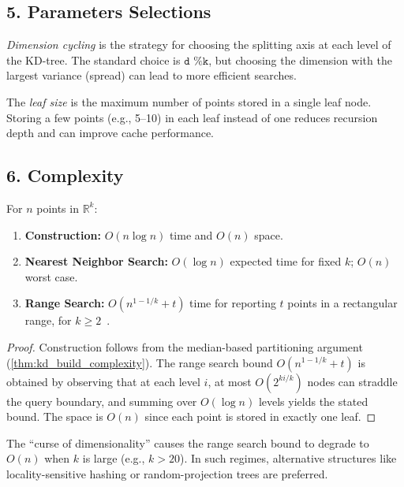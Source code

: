 \subsection{5. Parameters Selections}
\begin{definition}
\label{def:kd_dimension_cycling}
\emph{Dimension cycling} is the strategy for choosing the splitting axis at each level of the KD-tree. The standard choice is $\texttt{d \% k}$, but choosing the dimension with the largest variance (spread) can lead to more efficient searches.
\end{definition}

\begin{definition}
\label{def:kd_leaf_size}
The \emph{leaf size} is the maximum number of points stored in a single leaf node. Storing a few points (e.g., 5--10) in each leaf instead of one reduces recursion depth and can improve cache performance.
\end{definition}

\subsection{6. Complexity}
\begin{theorem}
\label{thm:kd_complexity}
For $n$ points in $\mathbb{R}^k$:
\begin{enumerate}
    \item \textbf{Construction:} $O(n \log n)$ time and $O(n)$ space.
    \item \textbf{Nearest Neighbor Search:} $O(\log n)$ expected time for fixed $k$; $O(n)$ worst case.
    \item \textbf{Range Search:} $O(n^{1-1/k} + t)$ time for reporting $t$ points in a rectangular range, for $k \ge 2$~\cite{friedman1977}.
\end{enumerate}
\end{theorem}
\begin{proof}
Construction follows from the median-based partitioning argument (\cref{thm:kd_build_complexity}). The range search bound $O(n^{1-1/k}+t)$ is obtained by observing that at each level $i$, at most $O(2^{ki/k})$ nodes can straddle the query boundary, and summing over $O(\log n)$ levels yields the stated bound. The space is $O(n)$ since each point is stored in exactly one leaf.
\end{proof}

\begin{remark}
The ``curse of dimensionality'' causes the range search bound to degrade to $O(n)$ when $k$ is large (e.g., $k > 20$). In such regimes, alternative structures like locality-sensitive hashing or random-projection trees are preferred.
\end{remark}

